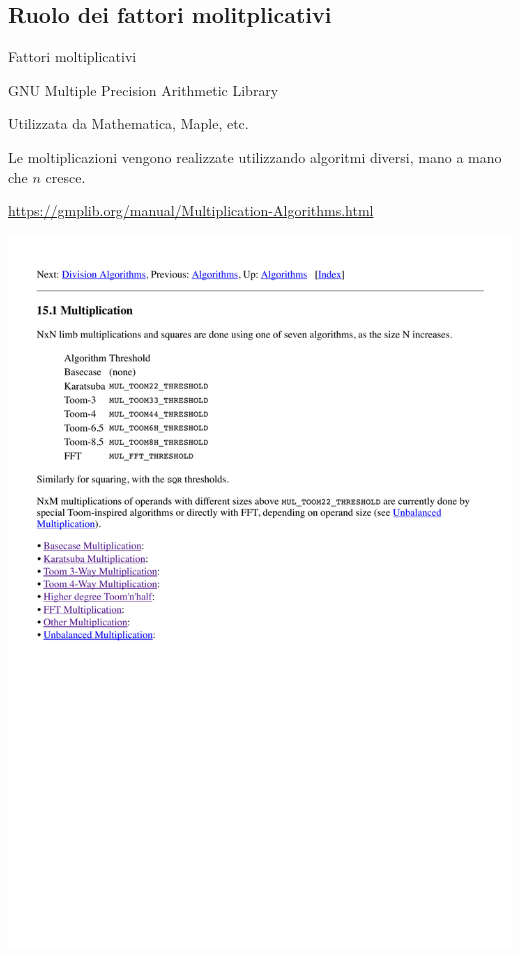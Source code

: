 \subsection{Ruolo dei fattori molitplicativi}

\begin{frame}{Fattori moltiplicativi}

\vspace{-9pt}	


\end{frame}

\begin{frame}{GNU Multiple Precision Arithmetic Library}

\BI
\item Utilizzata da Mathematica, Maple, etc.
\item Le moltiplicazioni vengono realizzate utilizzando algoritmi diversi,
mano a mano che $n$ cresce.
\item \url{https://gmplib.org/manual/Multiplication-Algorithms.html}
\EI

\medskip
\includegraphics[width=\textwidth]{gmp.pdf}

\end{frame}


